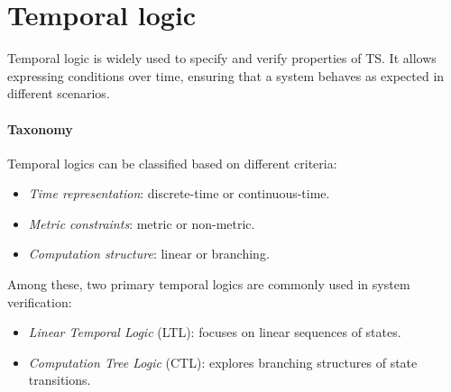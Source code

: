 \section{Temporal logic}

Temporal logic is widely used to specify and verify properties of TS. 
It allows expressing conditions over time, ensuring that a system behaves as expected in different scenarios.

\paragraph*{Taxonomy}
Temporal logics can be classified based on different criteria:
\begin{itemize}
    \item \textit{Time representation}: discrete-time or continuous-time.
    \item \textit{Metric constraints}: metric or non-metric.
    \item \textit{Computation structure}: linear or branching.
\end{itemize}
\noindent Among these, two primary temporal logics are commonly used in system verification:
\begin{itemize}
    \item \textit{Linear Temporal Logic} (LTL): focuses on linear sequences of states.
    \item \textit{Computation Tree Logic} (CTL): explores branching structures of state transitions.
\end{itemize}